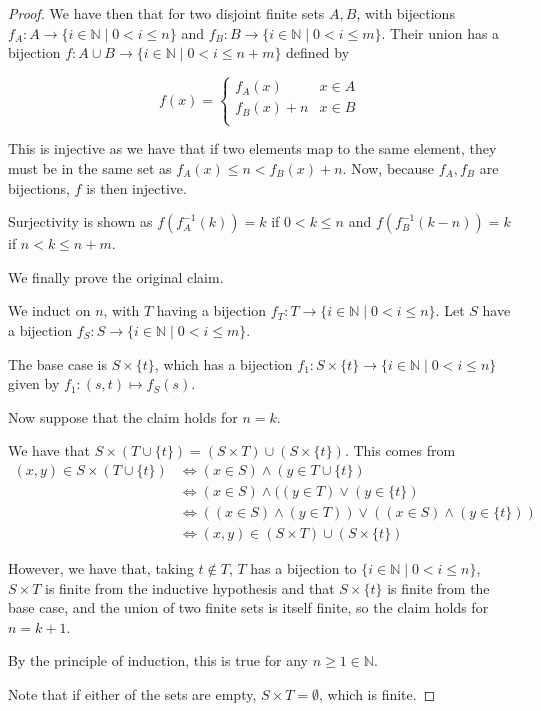 \documentclass[12pt,letterpaper]{article}
\theoremstyle{definition}
\newcommand{\N}{\mathbb{N}}
\begin{document}
\begin{proof}
    We have then that for two disjoint finite sets $A, B$, with bijections
    $f_A: A \rightarrow \{i \in \N \mid 0 < i \leq n\}$ and $f_B: B \rightarrow \{i \in \N \mid 0 < i \leq m\}$.
    Their union has a bijection $f: A\cup B \rightarrow \{i \in \N \mid 0 < i \leq n+m\}$
    defined by

    \[
    f(x) = \begin{cases}
        f_A(x) & x \in A \\
        f_B(x) + n & x \in B \\
    \end{cases}
    \]

    This is injective as we have that if two elements map to the same element,
    they must be in the same set as $f_A(x) \leq n < f_B(x) + n$. Now,
    because $f_A, f_B$ are bijections, $f$ is then injective.

    Surjectivity is shown as $f(f_A^{-1}(k)) = k$ if $0 < k \leq n$ and $f(f_B^{-1}(k-n)) = k$ if $n < k \leq n+m$.

    We finally prove the original claim.

    We induct on $n$, with $T$ having a bijection $f_T: T \rightarrow \{i \in \N \mid 0 < i \leq n\}$.
    Let $S$ have a bijection $f_S: S \rightarrow \{i \in \N \mid 0 < i \leq m\}$.

    The base case is $S \times \{t\}$, which has a bijection $f_1: S\times \{t\} \rightarrow  \{i \in \N \mid 0 < i \leq n\}$
    given by $f_1: (s,t) \mapsto f_S(s)$.

    Now suppose that the claim holds for $n = k$.

    We have that $S \times (T \cup \{t\}) = (S \times T) \cup (S \times \{t\})$.
    This comes from 
    \begin{align*}
        (x,y) \in S \times (T \cup \{t\}) &\iff (x \in S) \land (y \in T \cup \{t\}) \\
        &\iff (x \in S) \land ((y \in T) \lor (y \in \{t\}) \\
        &\iff ((x \in S) \land (y \in T)) \lor ((x\in S) \land (y \in \{t\})) \\
        &\iff (x,y) \in (S \times T) \cup (S \times \{t\})
    \end{align*}

    However, we have that, taking $t \notin T$, $T$ has a bijection to 
    $\{i \in \N \mid 0 < i \leq n\}$, $S \times T$ is finite from the inductive hypothesis and that
    $S \times \{t\}$ is finite from the base case, and the union of two finite sets
    is itself finite, so the claim holds for $n = k+1$.

    By the principle of induction, this is true for any $n \geq 1 \in \N$.

    Note that if either of the sets are empty, $S \times T = \emptyset$, which is finite.
\end{proof}
\end{document}
